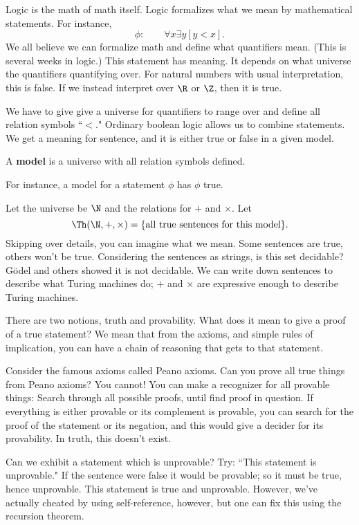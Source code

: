 Logic is the math of math itself. Logic formalizes what we mean by mathematical statements. For instance,
\[
\phi:\qquad \forall x\exists y[y<x].
\]
We all believe we can formalize math and define what quantifiers mean. (This is several weeks in logic.) This statement has meaning. It depends on what universe the quantifiers quantifying over. For natural numbers with usual interpretation, this is false. If we instead interpret over $\R$ or $\Z$, then it is true. 

We have to give give a universe for quantifiers to range over and define all relation symbols ``$<$." %
Ordinary boolean logic allows us to combine statements. %
We get a meaning for sentence, and it is either true or false in a given model.

\begin{df}
A \textbf{model} is a universe with all relation symbols defined. 
\end{df}
For instance, a model for a statement $\phi$ has $\phi$ true. 

Let the universe be $\N$ and the relations for $+$ and $\times$. %
Let 
\[
\Th(\N,+,\times)=\{\text{all true sentences for this model}\}.
\]
Skipping over details, you can imagine what we mean. Some sentences are true, others won't be true. %
Considering the sentences as strings, is this set decidable? G\"odel and others showed it is not decidable. We can write down sentences to describe what Turing machines do; $+$ and $\times$ are expressive enough to describe Turing machines. %

There are two notions, truth and provability. What does it  mean to give a proof of a true statement? We mean that from the axioms, and simple rules of implication, you can have a chain of reasoning that gets to that statement.

Consider the famous axioms called Peano axioms. Can you prove all true things from Peano axioms? You cannot! You can make a recognizer for all provable things: %
Search through all possible proofs, until find proof in question. If everything is either provable or its complement is provable, you can search for the proof of the statement or its negation, and this would give a decider for its provability. In truth, this doesn't exist.

Can we exhibit a statement which is unprovable? Try: ``This statement is unprovable." If the sentence were false it would be provable; so it must be true, hence unprovable. This statement is true and unprovable. However, we've actually cheated by using self-reference, however, but one can fix this using the recursion theorem. 
